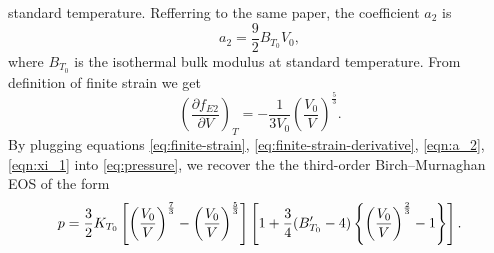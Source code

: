 standard temperature. Refferring to the same paper, the coefficient $a_2$ is
\begin{equation}
  a_2 = \frac{9}{2} B_{T_0} V_0,
  \label{eqn:a_2}
\end{equation}
where $B_{T_0}$ is the isothermal bulk modulus at standard temperature. From
definition of finite strain we get
\begin{equation}
  \left(\frac{\partial f_{E2}}{\partial V}\right)_T = - \frac{1}{3 V_0} \left(
    \frac{V_0}{V}
  \right)^{\frac{5}{3}}.
  \label{eq:finite-strain-derivative}
\end{equation}
By plugging equations \eqref{eq:finite-strain},
\eqref{eq:finite-strain-derivative}, \eqref{eqn:a_2}, \eqref{eqn:xi_1} into
\eqref{eq:pressure}, we recover the the third-order Birch--Murnaghan EOS of
the form
\begin{equation}
  \small{p = \frac{3}{2} K_{T_0} \left[
    \left(\frac{V_0}{V}\right)^{\frac{7}{3}}
    - \left(\frac{V_0}{V}\right)^{\frac{5}{3}}
  \right] \left[
    1 + \frac{3}{4}(B_{T_0}' - 4)\left\{
      \left(\frac{V_0}{V}\right)^{\frac{2}{3}} - 1
    \right\}
  \right].}
\end{equation}

